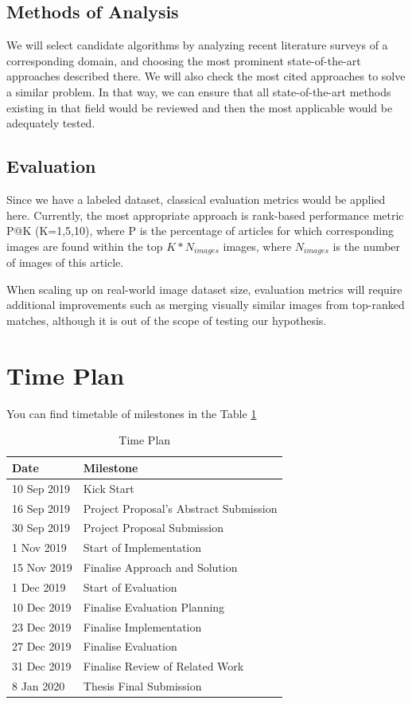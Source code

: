 \documentclass[runningheads]{llncs}
\begin{document}
\subsection{Methods of Analysis}
We will select candidate algorithms by analyzing recent literature surveys of a corresponding domain, and choosing the most prominent state-of-the-art approaches described there. We will also check the most cited approaches to solve a similar problem. In that way, we can ensure that all state-of-the-art methods existing in that field would be reviewed and then the most applicable would be adequately tested.

\subsection{Evaluation}
Since we have a labeled dataset, classical evaluation metrics would be applied here. Currently, the most appropriate approach is rank-based performance metric \cite{ref_evalmetric} P@K (K=1,5,10), where P is the percentage of articles for which corresponding images are found within the top $K * N_{images}$ images, where $N_{images}$ is the number of images of this article.

When scaling up on real-world image dataset size, evaluation metrics will require additional improvements such as merging visually similar images from top-ranked matches, although it is out of the scope of testing our hypothesis.

\section{Time Plan}
You can find timetable of milestones in the Table \ref{table_time_plan}
\begin{table}[htbp]
\centering
\caption{\label{table_time_plan}Time Plan}
 \begin{tabular}{| l | l |} 
 \hline
 Date & Milestone \\
 \hline
 10 Sep 2019 & Kick Start \\
 \hline
 16 Sep 2019 & Project Proposal's Abstract Submission \\
 \hline
 30 Sep 2019 & Project Proposal Submission \\  
 \hline
 1 Nov 2019 & Start of Implementation \\  
 \hline
 15 Nov 2019 & Finalise Approach and Solution \\  
 \hline
 1 Dec 2019 & Start of Evaluation \\  
 \hline
 10 Dec 2019 & Finalise Evaluation Planning \\  
 \hline
 23 Dec 2019 & Finalise Implementation \\  
 \hline
 27 Dec 2019 & Finalise Evaluation \\ 
 \hline
 31 Dec 2019 & Finalise Review of Related Work \\ 
 \hline
 8 Jan 2020 & Thesis Final Submission \\
 \hline
\end{tabular}
\end{table}
\end{document}
